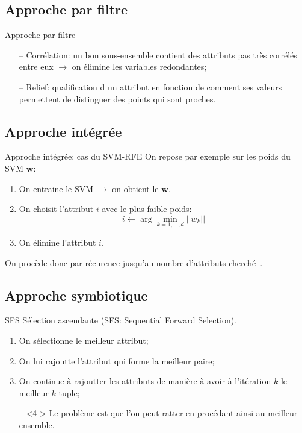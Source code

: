 \documentclass[9pt]{beamer}
\begin{document}
	\subsection[filter approach]{Approche par filtre}
	\begin{frame}{Approche par filtre}
		\begin{itemize}
			\item[--] Corrélation: un bon sous-ensemble contient des attributs pas très corrélés entre eux $\longrightarrow$ on élimine les variables redondantes;
			\item[--] Relief: qualification d un attribut en fonction de comment ses valeurs permettent de distinguer des points qui sont proches.
		\end{itemize}
	\end{frame}

	\subsection[integrated approach]{Approche intégrée}
	\begin{frame}{Approche intégrée: cas du SVM-RFE}
		On repose par exemple sur les poids du SVM $\textbf{w}$:
		\begin{enumerate}
			\item<1-> On entraine le SVM $\longrightarrow$ on obtient le $\textbf{w}$.
			\item<2-> On choisit l'attribut $i$ avec le plus faible poids:
			$$ i \leftarrow \arg \min_{k=1,\dots,d}{\vert\vert w_k\vert\vert}$$
			\item<3-> On élimine l'attribut $i$.
		\end{enumerate}
		On procède donc par récurence jusqu'au nombre d'attributs cherché~\cite{Guyon2002}.
	\end{frame}

	\subsection[symbiotic approach]{Approche symbiotique}
	\begin{frame}{SFS}
		Sélection ascendante (SFS\@: Sequential Forward Selection).
		\begin{enumerate}
		\item<1-> On sélectionne le meilleur attribut;
		\item<2-> On lui rajoutte l'attribut qui forme la meilleur paire;
		\item<3-> On continue à rajoutter les attributs de manière à avoir à l'itération $k$ le meilleur $k$-tuple;
		\item[--]<4-> Le problème est que l'on peut ratter en procédant ainsi au meilleur ensemble.
		\end{enumerate}
	\end{frame}
\end{document}
